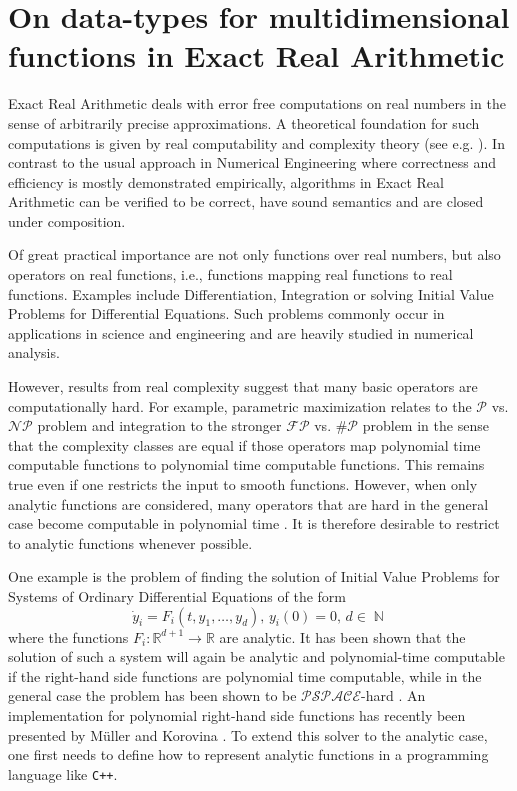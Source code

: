 \documentclass{article}
\newcommand{\RR}{\mathbb R}
\DeclareMathOperator{\NN}{\mathbb N}
\newcommand{\p}{\ensuremath{\mathcal P}\xspace}
\newcommand{\np}{\ensuremath{\mathcal{NP}}\xspace}
\newcommand{\fp}{\ensuremath{\mathcal{FP}}\xspace}
\newcommand{\sharpp}{\ensuremath{\# \mathcal{P}}\xspace}
\newcommand{\pspace}{\ensuremath{ \mathcal{PSPACE}}\xspace}
\newcommand{\cc}{\texttt{C++}\xspace}
\begin{document}
\section*{On data-types for multidimensional functions in Exact Real Arithmetic}
Exact Real Arithmetic deals with error free computations on real numbers in the sense of arbitrarily precise approximations. 
A theoretical foundation for such computations is given by real computability and complexity theory (see e.g. \cite{MR0089809, MR1137517,Weihrauch}).
In contrast to the usual approach in Numerical Engineering where correctness and efficiency is mostly demonstrated empirically, algorithms in Exact Real Arithmetic can be verified to be correct, have sound semantics and are closed under composition.


Of great practical importance are not only functions over real numbers, but also operators on real functions, i.e., functions mapping real functions to real functions.
Examples include Differentiation, Integration or solving Initial Value Problems for Differential Equations.
Such problems commonly occur in applications in science and engineering and are heavily studied in numerical analysis.

However, results from real complexity suggest that many basic operators are computationally hard. 
For example, parametric maximization relates to the $\p$ vs. $\np$ problem \cite{MR666209} and integration to the stronger $\fp$ vs. $\sharpp$ problem \cite{MR748898} in the sense that the complexity classes are equal if those operators map polynomial time computable functions to polynomial time computable functions.
This remains true even if one restricts the input to smooth functions.
However, when only analytic functions are considered, many operators that are hard in the general case become computable in polynomial time \cite{Kawamura2012}.
It is therefore desirable to restrict to analytic functions whenever possible.

One example is the problem of finding the solution of Initial Value Problems for Systems of Ordinary Differential Equations of the form 
$$ \dot y_i = F_i(t, y_1, \dots, y_d),\,y_i(0)=0,\, d \in \NN$$
where the functions $F_i : \RR^{d+1} \to \RR$ are analytic.
It has been shown that the solution of such a system will again be analytic and polynomial-time computable if the right-hand side functions are polynomial time computable, while in the general case the problem has been shown to be \pspace-hard \cite{Kawamura10}.
An implementation for polynomial right-hand side functions has recently been presented by M\"{u}ller and Korovina \cite{DBLP:journals/corr/abs-1006-0401}.
To extend this solver to the analytic case, one first needs to define how to represent analytic functions in a programming language like \cc.
\end{document}
